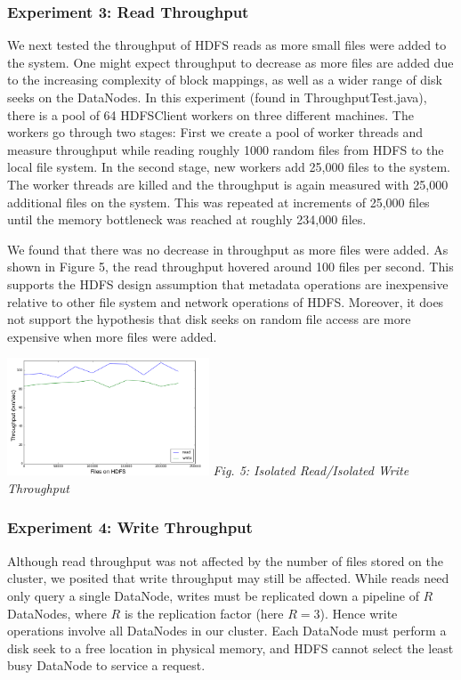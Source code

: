 \documentclass[11pt, a4paper]{article}
\begin{document}
\begin{multicols*}{2}
\subsubsection{Experiment 3: Read Throughput}\label{ReadThroughput}
We next tested the throughput of HDFS reads as more small files were added to the system. One might expect throughput to decrease as more files are added due to the increasing complexity of block mappings, as well as a wider range of disk seeks on the DataNodes. In this experiment (found in ThroughputTest.java), there is a pool of 64 HDFSClient workers on three different machines. The workers go through two stages: First we create a pool of worker threads and measure throughput while reading roughly 1000 random files from HDFS to the local file system. In the second stage, new workers add 25,000 files to the system. The worker threads are killed and the throughput is again measured with 25,000 additional files on the system. This was repeated at increments of 25,000 files until the memory bottleneck was reached at roughly 234,000 files.

We found that there was no decrease in throughput as more files were added. As shown in Figure 5, the read throughput hovered around 100 files per second. This supports the HDFS design assumption that metadata operations are inexpensive relative to other file system and network operations of HDFS. Moreover, it does not support the hypothesis that disk seeks on random file access are more expensive when more files were added.

\begin{center}
	\includegraphics[keepaspectratio=true, width=0.45\textwidth]{ThroughputResults}
	\textit{Fig. 5: Isolated Read/Isolated Write Throughput}
\end{center}
\subsubsection{Experiment 4: Write Throughput}\label{WriteThroughput}
Although read throughput was not affected by the number of files stored on the cluster, we posited that write throughput may still be affected. While reads need only query a single DataNode, writes must be replicated down a pipeline of $R$ DataNodes, where $R$ is the replication factor (here $R = 3$). Hence write operations involve all DataNodes in our cluster. Each DataNode must perform a disk seek to a free location in physical memory, and HDFS cannot select the least busy DataNode to service a request.


\end{multicols*}
\end{document}
